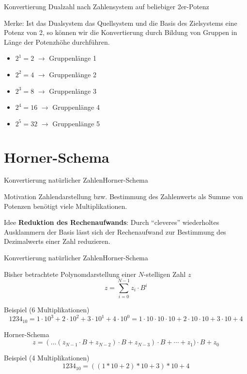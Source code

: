 \documentclass[xelatex,aspectratio=169]{beamer}
\begin{document}
\begin{frame}{Konvertierung Dualzahl nach Zahlensystem auf beliebiger 2er-Potenz}
  \begin{block}{Merke:}
    Ist das Dualsystem das Quellsystem und die Basis des Zielsystems eine Potenz von 2, so können wir die Konvertierung durch Bildung von Gruppen in Länge der Potenzhöhe durchführen.
    \begin{itemize}
      \item $2^1 = 2$ $\rightarrow$ Gruppenlänge 1
      \item $2^2 = 4$ $\rightarrow$ Gruppenlänge 2
      \item $2^3 = 8$ $\rightarrow$ Gruppenlänge 3
      \item $2^4 = 16$ $\rightarrow$ Gruppenlänge 4
      \item $2^5 = 32$ $\rightarrow$ Gruppenlänge 5
    \end{itemize}
  \end{block}
\end{frame}

\section{Horner-Schema}

\begin{frame}{Konvertierung natürlicher Zahlen}{Horner-Schema}
  \begin{block}{Motivation}
    Zahlendarstellung bzw. Bestimmung des Zahlenwerts als Summe von Potenzen benötigt viele Multiplikationen.
  \end{block}
  \begin{block}{Idee}
    \textbf{Reduktion des Rechenaufwands}: Durch \enquote{cleveres} wiederholtes Ausklammern der Basis lässt sich der Rechenaufwand zur Bestimmung des Dezimalwerts einer Zahl reduzieren.
  \end{block}

\end{frame}


\begin{frame}{Konvertierung natürlicher Zahlen}{Horner-Schema}
  \begin{block}{Bisher betrachtete Polynomdarstellung einer $N$-stelligen Zahl $z$}
    \[ z = \sum_{i=0}^{N-1} z_i \cdot B^i \]
  \end{block}
  \begin{exampleblock}{Beispiel (6 Multiplikationen)}
    \vspace{-\baselineskip}
    \[1234_{10} = 1 \cdot 10^3 + 2 \cdot 10^2 + 3 \cdot 10^1 + 4 \cdot 10^0 = 1 \cdot 10 \cdot 10 \cdot 10 + 2 \cdot 10 \cdot 10 + 3 \cdot 10 + 4\]
  \end{exampleblock}
  \begin{block}{Horner-Schema}
    \[ z = (\dots (z_{N-1} \cdot B + z_{N-2}) \cdot B + z_{N-3}) \cdot B  + \cdots + z_1) \cdot B + z_0 \]
  \end{block}
  \begin{exampleblock}{Beispiel (4 Multiplikationen)}
    \vspace{-.1\baselineskip}
    \[1234_{10} = ((1 * 10 + 2) * 10 + 3) * 10 + 4\]
  \end{exampleblock}
\end{frame}
\end{document}
